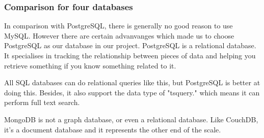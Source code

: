 \subsubsection{Comparison for four databases}
In comparison with PostgreSQL, there is generally no good reason to use MySQL. 
However there are certain advanvanges which made us to choose PostgreSQL as our database in our project.
PostgreSQL is a relational database. It specialises in tracking the relationship between pieces of data 
and helping you retrieve something if you know something related to it.

All SQL databases can do relational queries like this, but PostgreSQL is better at doing this. 
Besides, it also support the data type of "tsquery." which means it can perform full text search.


MongoDB is not a graph database, or even a relational database. 
Like CouchDB, it's a document database and it represents the other end of the scale. 

